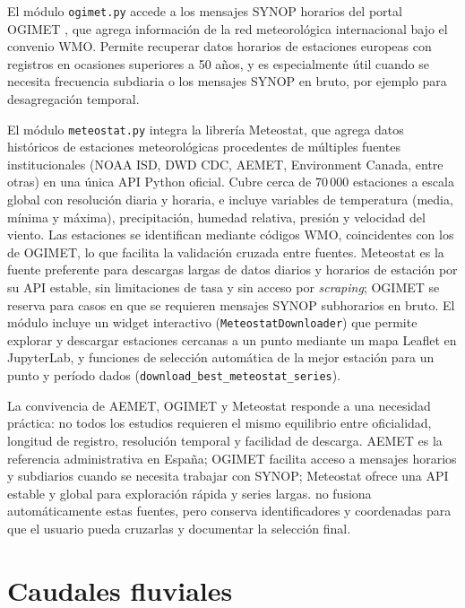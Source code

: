 El módulo \texttt{ogimet.py} accede a los mensajes SYNOP horarios del portal OGIMET \parencite{ogimet}, que agrega información de la red meteorológica internacional bajo el convenio WMO. Permite recuperar datos horarios de estaciones europeas con registros en ocasiones superiores a 50 años, y es especialmente útil cuando se necesita frecuencia subdiaria o los mensajes SYNOP en bruto, por ejemplo para desagregación temporal.

El módulo \texttt{meteostat.py} \parencite{zippenfenig2023meteostat} integra la librería Meteostat, que agrega datos históricos de estaciones meteorológicas procedentes de múltiples fuentes institucionales (NOAA ISD, DWD CDC, AEMET, Environment Canada, entre otras) en una única API Python oficial. Cubre cerca de 70\,000 estaciones a escala global con resolución diaria y horaria, e incluye variables de temperatura (media, mínima y máxima), precipitación, humedad relativa, presión y velocidad del viento. Las estaciones se identifican mediante códigos WMO, coincidentes con los de OGIMET, lo que facilita la validación cruzada entre fuentes. Meteostat es la fuente preferente para descargas largas de datos diarios y horarios de estación por su API estable, sin limitaciones de tasa y sin acceso por \textit{scraping}; OGIMET se reserva para casos en que se requieren mensajes SYNOP subhorarios en bruto. El módulo incluye un widget interactivo (\texttt{MeteostatDownloader}) que permite explorar y descargar estaciones cercanas a un punto mediante un mapa Leaflet en JupyterLab, y funciones de selección automática de la mejor estación para un punto y período dados (\texttt{download\_best\_meteostat\_series}).

La convivencia de AEMET, OGIMET y Meteostat responde a una necesidad práctica: no todos los estudios requieren el mismo equilibrio entre oficialidad, longitud de registro, resolución temporal y facilidad de descarga. AEMET es la referencia administrativa en España; OGIMET facilita acceso a mensajes horarios y subdiarios cuando se necesita trabajar con SYNOP; Meteostat ofrece una API estable y global para exploración rápida y series largas. \pyhydra no fusiona automáticamente estas fuentes, pero conserva identificadores y coordenadas para que el usuario pueda cruzarlas y documentar la selección final.

\section{Caudales fluviales}

